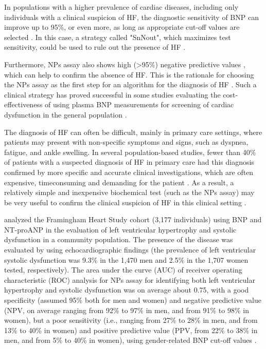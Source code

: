 \documentclass[14pt,a4paper,onecolumn]{extarticle}
\begin{document}
In populations with a higher prevalence of cardiac diseases, including only individuals with a clinical suspicion of HF, the diagnostic sensitivity of BNP can improve up to 95\%, or even more, as long as appropriate cut-off values are selected \citep{bib35} \citep{bib372}. In this case, a strategy called "SnNout", which maximizes test sensitivity, could be used to rule out the presence of HF \citep{bib391}.

Furthermore, NPs assay also shows high (>95\%) negative predictive values \citep{bib35} \citep{bib320}, which can help to confirm the absence of HF. This is the rationale for choosing the NPs assay as the first step for an algorithm for the diagnosis of HF \citep{bib369} \citep{bib370}. Such a clinical strategy has proved successful in some  studies evaluating the cost-effectiveness of using plasma BNP measurements for screening of cardiac dysfunction in the general population \citep{bib392} \citep{bib393} \citep{bib3171}.

The diagnosis of HF can often be difficult, mainly in primary care settings, where patients may present with non-specific symptoms and signs, such as dyspnea, fatigue, and ankle swelling. In several population-based studies, fewer than 40\% of patients with a suspected diagnosis of HF in primary care had this diagnosis confirmed by more specific and accurate clinical investigations, which are often expensive, timeconsuming and demanding for the patient \citep{bib369} \citep{bib370} \citep{bib3105}. As a result, a relatively simple and inexpensive biochemical test (such as the NPs assay) may be very useful to confirm the clinical suspicion of HF in this clinical setting \citep{bib35} \citep{bib3131} \citep{bib335}.

\citep{bib39} analyzed the Framingham Heart Study cohort (3,177 individuals) using BNP and NT-proANP in the evaluation of left ventricular hypertrophy and systolic dysfunction in a community population.  The presence of the disease was evaluated by using echocardiographic findings (the prevalence of left ventricular systolic dysfunction was 9.3\% in the 1,470 men and 2.5\% in the 1,707 women tested, respectively). The area under the curve (AUC) of receiver operating characteristic (ROC) analysis for NPs assay for identifying both left ventricular hypertrophy and systolic dysfunction was on average about 0.75, with a good specificity (assumed 95\% both for men and women) and negative predictive value (NPV, on average ranging from 92\% to 97\% in men, and from 91\% to 98\% in women), but a poor sensitivity (i.e., ranging from 27\% to 28\% in men, and from 13\% to 40\% in women) and positive predictive value (PPV, from 22\% to 38\% in men, and from 5\% to 40\% in women), using gender-related BNP cut-off values \citep{bib39}.
\end{document}
